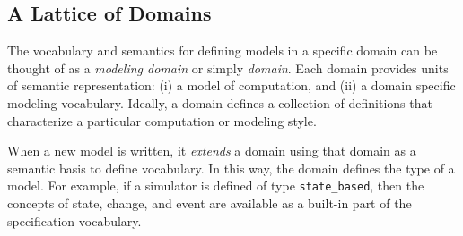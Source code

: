 \documentclass[12pt]{article}
\newcommand{\nael}[1]{\color{blue}{ \em #1 }\color{black}}
\renewcommand{\nael}[1]{}
\begin{document}
\nael{We need a domain to use as our case study here and to ground the descriptions.  The
  call mentions electronic warfare (EW), Intelligence surveillance and reconnaissance
  (ISR) and strike (which I assume is what it sounds like.)  Examples of EW and ISR from a
  quick search and skim include UaVs interacting with manned systems.  At one scale you
  have sensor data streaming with fine grained spatio-temporal resolution, and at another
  you are making tactical decisions at possibly much larger times and scales.}

\nael{From an AFOSR call on EW/ISR: ``The ultimate goal for airborne ISR and AEW/C2BM is
  to enable decision superiority and this will continue to be enabled by the confluence of
  hardware assets and the operators and analysts. Budgets will underpin the makeup of
  future capabilities and dictate the economics of introducing new platforms versus
  upgrading capabilities as existing platforms approach critical junctures in their
  operational lifecycle. In the case of radar systems, demand will come from existing
  platforms being retrofitted and upgraded, as well as opportunities from new manned and
  unmanned platforms, driving shipments a CAGR of 5 percent through 2022.''}

\subsection{A Lattice of Domains}


The vocabulary and semantics for defining models in a specific domain can be thought of as
a \emph{modeling domain} or simply \emph{domain}.  Each domain provides units of semantic
representation: (i) a model of computation, and (ii) a domain specific modeling
vocabulary.  Ideally, a domain defines a collection of definitions that characterize a
particular computation or modeling style.

When a new model is written, it \emph{extends} a domain using that domain as a semantic
basis to define vocabulary.  In this way, the domain defines the type of a model.  For
example, if a simulator is defined of type \lstinline!state_based!, then the concepts of
state, change, and event are available as a built-in part of the specification vocabulary.
\end{document}

